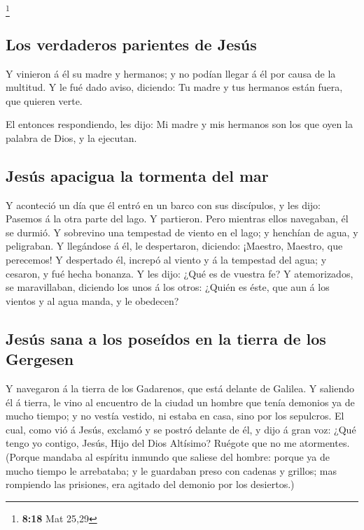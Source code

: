 \footnote{\textbf{8:18} Mat 25,29}

\hypertarget{los-verdaderos-parientes-de-jesuxfas}{%
\subsection{Los verdaderos parientes de
Jesús}\label{los-verdaderos-parientes-de-jesuxfas}}

 Y vinieron á él su madre y hermanos; y no podían llegar
á él por causa de la multitud.  Y le fué dado aviso,
diciendo: Tu madre y tus hermanos están fuera, que quieren verte.

 El entonces respondiendo, les dijo: Mi madre y mis
hermanos son los que oyen la palabra de Dios, y la ejecutan.

\hypertarget{jesuxfas-apacigua-la-tormenta-del-mar}{%
\subsection{Jesús apacigua la tormenta del
mar}\label{jesuxfas-apacigua-la-tormenta-del-mar}}

 Y aconteció un día que él entró en un barco con sus
discípulos, y les dijo: Pasemos á la otra parte del lago. Y partieron.
 Pero mientras ellos navegaban, él se durmió. Y sobrevino
una tempestad de viento en el lago; y henchían de agua, y peligraban.
 Y llegándose á él, le despertaron, diciendo: ¡Maestro,
Maestro, que perecemos! Y despertado él, increpó al viento y á la
tempestad del agua; y cesaron, y fué hecha bonanza.  Y
les dijo: ¿Qué es de vuestra fe? Y atemorizados, se maravillaban,
diciendo los unos á los otros: ¿Quién es éste, que aun á los vientos y
al agua manda, y le obedecen?

\hypertarget{jesuxfas-sana-a-los-poseuxeddos-en-la-tierra-de-los-gergesen}{%
\subsection{Jesús sana a los poseídos en la tierra de los
Gergesen}\label{jesuxfas-sana-a-los-poseuxeddos-en-la-tierra-de-los-gergesen}}

 Y navegaron á la tierra de los Gadarenos, que está
delante de Galilea.  Y saliendo él á tierra, le vino al
encuentro de la ciudad un hombre que tenía demonios ya de mucho tiempo;
y no vestía vestido, ni estaba en casa, sino por los sepulcros.
 El cual, como vió á Jesús, exclamó y se postró delante
de él, y dijo á gran voz: ¿Qué tengo yo contigo, Jesús, Hijo del Dios
Altísimo? Ruégote que no me atormentes.  (Porque mandaba
al espíritu inmundo que saliese del hombre: porque ya de mucho tiempo le
arrebataba; y le guardaban preso con cadenas y grillos; mas rompiendo
las prisiones, era agitado del demonio por los desiertos.)


